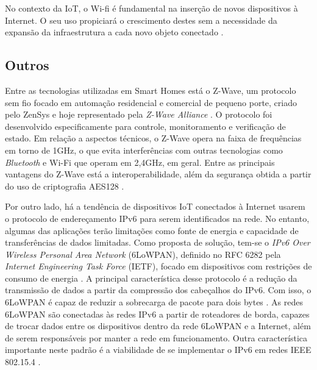 No contexto da IoT, o Wi-fi é fundamental na inserção de novos dispositivos à Internet. O seu uso propiciará o crescimento destes sem a necessidade da expansão da infraestrutura a cada novo objeto conectado \cite{Suresh2014}.

\subsection{Outros}
Entre as tecnologias utilizadas em Smart Homes está o Z-Wave, um protocolo sem fio focado em automação residencial e comercial de pequeno porte, criado pelo ZenSys e hoje representado pela \textit{Z-Wave Alliance } \cite{Gomez2010}. O protocolo foi desenvolvido especificamente para controle, monitoramento e verificação de estado. Em relação a aspectos técnicos, o Z-Wave opera na faixa de frequências em torno de 1GHz, o que evita interferências com outras tecnologias como \textit{Bluetooth} e Wi-Fi que operam em 2,4GHz, em geral. Entre as principais vantagens do Z-Wave está a interoperabilidade, além da segurança obtida a partir do uso de criptografia  AES128 \cite{Z-WaveAlliance2015}.


Por outro lado, há a tendência de dispositivos IoT conectados à Internet usarem o protocolo de endereçamento IPv6 para serem identificados na rede. No entanto, algumas das aplicações terão limitações como fonte de energia e capacidade de transferências de dados limitadas. Como proposta de solução, tem-se o \textit{IPv6 Over Wireless Personal Area Network} (6LoWPAN), definido no RFC 6282 pela \textit{Internet Engineering Task Force} (IETF), focado em dispositivos com restrições de consumo de energia \cite{Olsson2014}. A principal característica desse protocolo é a redução da transmissão de dados a partir da compressão dos cabeçalhos do IPv6. Com isso, o 6LoWPAN é capaz de reduzir a sobrecarga de pacote para dois bytes \cite{Al-Fuqaha2015}. As redes 6LoWPAN são conectadas às redes IPv6 a partir de roteadores de borda, capazes de trocar dados entre os dispositivos dentro da rede 6LoWPAN e a Internet, além de serem responsáveis por manter a rede em funcionamento. Outra característica importante neste padrão é a viabilidade de se implementar o IPv6 em redes IEEE 802.15.4 \cite{Olsson2014}.




